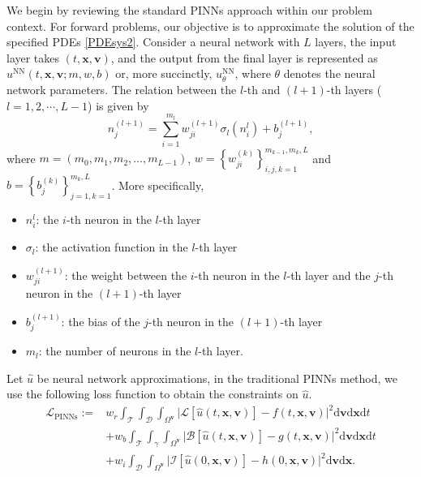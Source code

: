 \documentclass[preprint,11pt]{elsarticle}
\newcommand{\bx}{\boldsymbol{x}}
\newcommand{\bv}{\boldsymbol{v}}
\begin{document}
We begin by reviewing the standard PINNs approach within our problem context. For forward problems, our objective is to approximate the solution of the specified PDEs \eqref{PDEsys2}. Consider a neural network with $L$ layers, the input layer takes $(t,\boldsymbol{x},\boldsymbol{v})$, and the output from the final layer is represented as $u^{\text{NN}}(t,\boldsymbol{x},\boldsymbol{v};m,w,b)$ or, more succinctly, $u^{\text{NN}}_{\theta}$, where $\theta$ denotes the neural network parameters. The relation between the $l$-th and $(l+1)$-th layers ($l=1,2, \cdots, L-1$) is given by
\begin{equation}\label{two-layer}
    n_j^{(l+1)}=\sum_{i=1}^{m_{l}} w_{j i}^{(l+1)} \sigma_{l} (n_{i}^{l})+b_{j}^{(l+1)},
\end{equation} 
where $m=\left(m_{0}, m_{1}, m_{2}, \dots, m_{L-1}\right)$, $w=\left\{w_{j i}^{(k)}\right\}_{i, j, k=1}^{m_{k-1}, m_{k}, L}$ and $b=\left\{b_{j}^{(k)}\right\}_{j=1, k=1}^{m_{k}, L}$. More specifically, 
\begin{itemize}
    \item $n_i^l$: the $i$-th neuron in the $l$-th layer 
    \item $\sigma_l$: the activation function in the $l$-th layer
    \item $w_{j i}^{(l+1)}$: the weight between the $i$-th neuron in the $l$-th layer and the $j$-th neuron in the $(l+1)$-th layer
    \item $b_j^{(l+1)}$: the bias of the $j$-th neuron in the $(l+1)$-th layer
    \item $m_l$: the number of neurons in the $l$-th layer. 
\end{itemize}
Let $\hat{u}$ be neural network approximations, in the traditional PINNs method, we use the following loss function to obtain the constraints on $\hat{u}$.
\begin{equation}
\begin{aligned}
\mathcal{L}_\text{PINNs} :=& w_r \int_{\mathcal{T}} \int_{\mathcal{D}} \int_{\Omega^{\bv}} \Big| \mathcal{L}[\hat{u}(t, \boldsymbol{x}, \boldsymbol{v})]-f(t, \boldsymbol{x}, \boldsymbol{v})\Big|^2  \mathrm{d}\bv \mathrm{d}\bx \mathrm{d}t\\
&+ w_b \int_{\mathcal{T}} \int_\gamma\int_{\Omega^{\boldsymbol{v}}} \Big| \mathcal{B}[\hat{u}(t, \boldsymbol{x}, \boldsymbol{v})]-g(t, \boldsymbol{x}, \boldsymbol{v})\Big|^2  \mathrm{d}\boldsymbol{v}\mathrm{d}\boldsymbol{x} \mathrm{d}t\\
&+ w_i  \int_{\mathcal{D}} \int_{\Omega^{\bv}} \Big| \mathcal{I}[\hat{u}(0, \boldsymbol{x}, \boldsymbol{v})]-h(0, \boldsymbol{x}, \boldsymbol{v})\Big|^2 \mathrm{d}\bv \mathrm{d}\bx. 
\end{aligned}
\label{eq:pinn_loss}
\end{equation}
\end{document}

